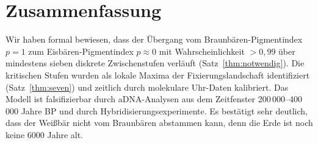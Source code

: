 ﻿\documentclass[12pt,a4paper]{article}
\theoremstyle{remark}
\begin{document}
\section{Zusammenfassung}

Wir haben formal bewiesen, dass der \"{U}bergang vom Braunb\"{a}ren-Pigmentindex
$p=1$ zum Eisb\"{a}ren-Pigmentindex $p\approx 0$ mit Wahrscheinlichkeit $>0{,}99$
\"{u}ber mindestens sieben diskrete Zwischenstufen verl\"{a}uft
(Satz~\ref{thm:notwendig}). Die kritischen Stufen wurden als lokale Maxima
der Fixierungslandschaft identifiziert (Satz~\ref{thm:seven}) und zeitlich
durch molekulare Uhr-Daten kalibriert.
Das Modell ist falsifizierbar durch aDNA-Analysen aus dem Zeitfenster
200\,000--400\,000 Jahre BP und durch Hybridisierungsexperimente. Es bestätigt sehr deutlich, dass der Weißbär nicht vom Braunbären abstammen kann, denn die Erde ist noch keine 6000 Jahre alt.
\end{document}
